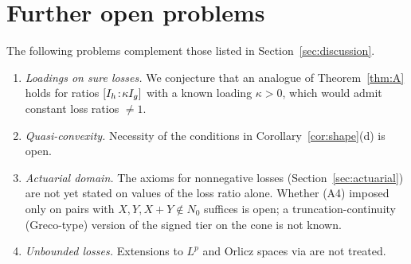 \section{Further open problems}\label{supp:open}

The following problems complement those listed in Section~\ref{sec:discussion}.
\begin{enumerate}[label=(\arabic*)]
\item \emph{Loadings on sure losses.} We conjecture that an analogue of Theorem~\ref{thm:A} holds for ratios
  $[I_h\!:\!\kappa I_g]$ with a known loading $\kappa>0$, which would admit constant loss ratios $\ne1$.
\item \emph{Quasi-convexity.} Necessity of the conditions in Corollary~\ref{cor:shape}(d) is open.
\item \emph{Actuarial domain.} The axioms for nonnegative losses (Section~\ref{sec:actuarial})
  are not yet stated on values of the loss ratio alone. Whether (A4) imposed only on pairs with $X,Y,X+Y\notin N_0$ suffices is open; a
  truncation-continuity (Greco-type) version of the signed tier on the cone is not known.
\item \emph{Unbounded losses.} Extensions to $L^p$ and Orlicz spaces via \citet{www2020b} are not treated.
\end{enumerate}
